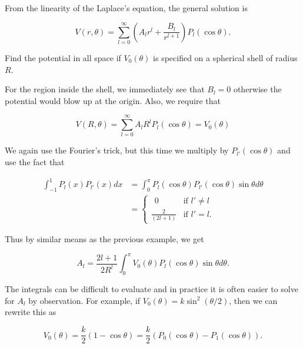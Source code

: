 \documentclass[english,a4paper,12pt]{report}
\begin{document}
From the linearity of the Laplace's equation, the general solution is

\begin{equation}
    V(r,\theta ) = \sum_{l=0}^{\infty} (A_{l} r^{l} + \frac{B_{l} }{r^{l+1} } )P_{l} (\cos \theta). \label{sphlap1} 
\end{equation}

{Find the potential in all space if \(V_0(\theta )\) is specified on a spherical shell of radius \(R\).}
{For the region inside the shell, we immediately see that \(B_{l} = 0\) otherwise the potential would blow up at the origin. Also, we require that 

\begin{equation}
    V(R,\theta ) = \sum_{l=0}^{\infty} A_{l} R^{l} P_{l} (\cos \theta ) = V_{0} (\theta )
\end{equation}

We again use the Fourier's trick, but this time we multiply by \(P_{l'} (\cos \theta )\) and use the fact that 

\begin{equation}
    \begin{aligned}
        \int_{-1}^{1} P_{l} (x) P_{l'} (x) dx &= \int_{0}^{\pi } P_{l} (\cos \theta ) P_{l'} (\cos \theta ) \sin \theta d\theta \\ &= \begin{cases}
            ~~0 & \text{if } l' \neq l \\[10pt]
            \frac{2}{(2l+1)}  & \text{if } l' = l.
            \end{cases}
    \end{aligned}
\end{equation}

Thus by similar means as the previous example, we get

\begin{equation}
    A_{l} = \frac{2l+1}{2R^{l} } \int_{0}^{\pi } V_{0} (\theta ) P_{l} (\cos \theta ) \sin \theta d\theta.
\end{equation}

The integrals can be difficult to evaluate and in practice it is often easier to solve for \(A_{l} \) by observation. For example, if \(V_0(\theta ) = k\sin ^2\left(\theta /2\right)\), then we can rewrite this as

\begin{equation}
    V_0(\theta ) = \frac{k}{2} (1-\cos \theta ) = \frac{k}{2} (P_0(\cos \theta ) - P_1(\cos \theta )).
\end{equation}

}
\end{document}
